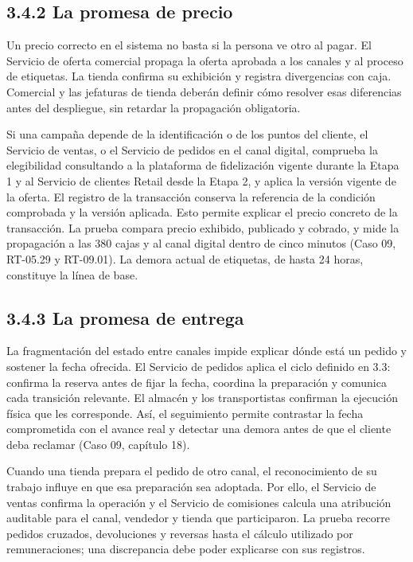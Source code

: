 \documentclass[11pt]{article}
\begin{document}
\subsection{3.4.2 La promesa de precio}

{Un precio correcto en el sistema no basta si la persona ve otro al pagar. El Servicio de oferta comercial propaga la oferta aprobada a los canales y al proceso de etiquetas. La tienda confirma su exhibición y registra divergencias con caja. Comercial y las jefaturas de tienda deberán definir cómo resolver esas diferencias antes del despliegue, sin retardar la propagación obligatoria.}

{Si una campaña depende de la identificación o de los puntos del cliente, el Servicio de ventas, o el Servicio de pedidos en el canal digital, comprueba la elegibilidad consultando a la plataforma de fidelización vigente durante la Etapa 1 y al Servicio de clientes Retail desde la Etapa 2, y aplica la versión vigente de la oferta. El registro de la transacción conserva la referencia de la condición comprobada y la versión aplicada. Esto permite explicar el precio concreto de la transacción. La prueba compara precio exhibido, publicado y cobrado, y mide la propagación a las 380 cajas y al canal digital dentro de cinco minutos (Caso 09, RT-05.29 y RT-09.01). La demora actual de etiquetas, de hasta 24 horas, constituye la línea de base.}

\subsection{3.4.3 La promesa de entrega}

{La fragmentación del estado entre canales impide explicar dónde está un pedido y sostener la fecha ofrecida. El Servicio de pedidos aplica el ciclo definido en 3.3: confirma la reserva antes de fijar la fecha, coordina la preparación y comunica cada transición relevante. El almacén y los transportistas confirman la ejecución física que les corresponde. Así, el seguimiento permite contrastar la fecha comprometida con el avance real y detectar una demora antes de que el cliente deba reclamar (Caso 09, capítulo 18).}

{Cuando una tienda prepara el pedido de otro canal, el reconocimiento de su trabajo influye en que esa preparación sea adoptada. Por ello, el Servicio de ventas confirma la operación y el Servicio de comisiones calcula una atribución auditable para el canal, vendedor y tienda que participaron. La prueba recorre pedidos cruzados, devoluciones y reversas hasta el cálculo utilizado por remuneraciones; una discrepancia debe poder explicarse con sus registros.}
\end{document}
